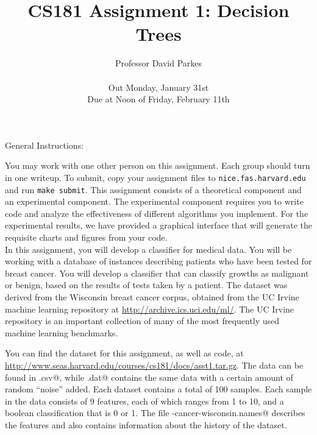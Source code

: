 \documentclass{article}
\begin{document}
\title{CS181 Assignment 1: Decision Trees}
\author{Professor David Parkes\\\\Out Monday, January 31st\\Due at
  Noon of Friday, February 11th}

\maketitle

\noindent General Instructions:

You may work with one other person on this assignment.
Each group should turn in one writeup. To submit, copy your assignment
files to \verb=nice.fas.harvard.edu= and run \verb=make submit=.
This assignment consists of a theoretical component and an experimental
component.  The experimental component requires you to write code and
analyze the effectiveness
of different algorithms you implement.  For the experimental results,
we have provided a graphical interface that will generate the
requisite charts and figures from your code.\\

In this assignment, you will develop a classifier for medical data.  You will be working with a
database of instances describing patients who have been tested for breast cancer.
You will develop a classifier that can classify growths as
malignant or benign, based on the results of tests taken by a patient.
The dataset was derived from the Wisconsin breast cancer corpus,
obtained from the UC Irvine machine learning repository at \url{http://archive.ics.uci.edu/ml/}.
The UC Irvine repository is an important collection of many of the
most frequently used machine learning benchmarks.

You can find the dataset for this assignment, as well as code, at
\url{http://www.seas.harvard.edu/courses/cs181/docs/asst1.tar.gz}.  The data can
be found in \verb@data.csv@, while \verb@noisy.dat@ contains the same data with a certain amount of
random ``noise'' added.  Each dataset contains a total of 100 samples.  Each sample in the data
consists of 9 features, each of which ranges from 1 to 10, and a boolean classification that is 0 or
1.  The file \verb@breast-cancer-wisconsin.names@ describes the features and also contains
information about the history of the dataset.
\end{document}
